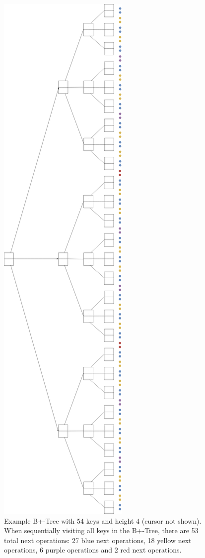 \begin{figure}[p]
    \centering
    \includegraphics[scale=0.18]{figures/amortizedtimenextexamplehugerotated.png}
    \caption{Example B+-Tree with 54 keys and height 4 (cursor not shown). When sequentially visiting all keys in the B+-Tree, there are 53 total next operations: 27 blue next operations, 18 yellow next operations, 6 purple operations and 2 red next operations.}
    \label{fig:amortizedanalysisheight4}
\end{figure}

